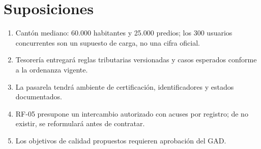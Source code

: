 \documentclass[conference,onecolumn]{IEEEtran}
\begin{document}
\section*{Suposiciones}
\begin{enumerate}
\setlength{\itemsep}{0pt}\setlength{\parsep}{0pt}\setlength{\topsep}{2pt}
\item Cantón mediano: 60.000 habitantes y 25.000 predios; los 300 usuarios concurrentes son un supuesto de carga, no una cifra oficial.
\item Tesorería entregará reglas tributarias versionadas y casos esperados conforme a la ordenanza vigente.
\item La pasarela tendrá ambiente de certificación, identificadores y estados documentados.
\item RF-05 presupone un intercambio autorizado con acuses por registro; de no existir, se reformulará antes de contratar.
\item Los objetivos de calidad propuestos requieren aprobación del GAD.
\end{enumerate}

\printbibliography[title={Referencias}]
\end{document}
